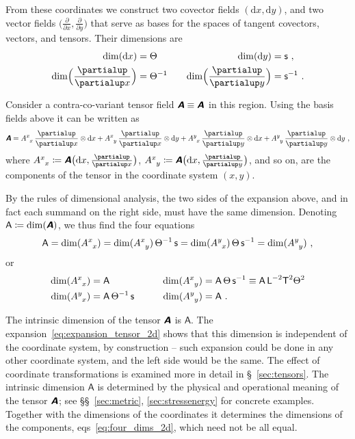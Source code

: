 \documentclass[\ifafour a4paper,12pt,\else a5paper,10pt,\fi%
onecolumn,oneside,article,%
british%
]{memoir}
\makeatletter
\theoremstyle{remark}
\theoremstyle{innote}
\newcommand*{\mathte}[1]{\textbf{\textit{\textsf{#1}}}}
\newcommand*{\de}{\partialup}%
\newcommand*{\di}{\mathrm{d}}%
\newcommand*{\defd}{\coloneqq}
\renewcommand*{\|}[1][]{\nonscript\,#1\vert\nonscript\;\mathopen{}}
\newcommand*{\sect}{\S}%
\newcommand*{\sects}{\S\S}%
\newcommand*{\eqns}{eqs}%
\newcommand*{\q}{}%
\DeclareRobustCommand*{\q}{%
  \mathord{\mathpalette\bigcdot@{}}%
}
\newcommand*{\bigcdot@scalefactor}{0.7}
\newcommand*{\bigcdot@widthfactor}{1.5}
\newcommand*{\bigcdot@}[2]{%
  \sbox0{$#1\vcenter{}$}%
  \sbox2{$#1\cdot\m@th$}%
  \hbox to \bigcdot@widthfactor\wd2{%
    \hfil
    \raise\ht0\hbox{%
      \scalebox{\bigcdot@scalefactor}{%
        \lower\ht0\hbox{$#1\bullet\m@th$}%
      }%
    }%
    \hfil
  }%
}
\newcommand*{\Le}{\textsf{L}}
\newcommand*{\Ti}{\textsf{T}}
\newcommand*{\Te}{\Theta}
\newcommand*{\Ent}{\textsf{s}}
\newcommand*{\Aa}{\textsf{A}}
\newcommand*{\yA}{\mathte{A}}
\renewcommand*{\i}{\indices}
\makeatother
\begin{document}
From these coordinates we construct two covector fields $(\di x, \di y)$,
and two vector fields $\bigl(\frac{\de}{\de x}, \frac{\de}{\de y}\bigr)$
that serve as bases for the spaces of tangent covectors, vectors, and
tensors. Their dimensions are
\begin{equation}
  \label{eq:example_basisvects2d}
  \begin{aligned}
    \dim(\di x)&=\Te &\quad \dim(\di y)&= \Ent \ ,
    \\
    \dim\Bigl(\frac{\de}{\de x}\Bigr)&=\Te^{-1} &\quad \dim\Bigl(\frac{\de}{\de y}\Bigr)&= \Ent^{-1} \ .
  \end{aligned}
\end{equation}


Consider a contra-co-variant tensor field $\yA \equiv \yA\i{^{\q}_{\q}}$ in
this region. Using the basis fields above it can be written as
\begin{equation}
  \label{eq:expansion_tensor_2d}
  \yA = 
  A\i{^{x}_{x}}\,\frac{\de}{\de x} \otimes\di x + 
  A\i{^{x}_{y}}\,\frac{\de}{\de x} \otimes\di y + 
  A\i{^{y}_{x}}\,\frac{\de}{\de y} \otimes\di x + 
  A\i{^{y}_{y}}\,\frac{\de}{\de y} \otimes\di y \ ,
\end{equation}
where $A\i{^{x}_{x}} \defd \yA\bigl(\di x, \frac{\de}{\de x}\bigr)$,
$A\i{^{x}_{y}} \defd \yA\bigl(\di x, \frac{\de}{\de y}\bigr)$, and so on,
are the components of the tensor in the coordinate system $(x, y)$.

By the rules of dimensional analysis, the two sides of the expansion above,
and in fact each summand on the right side, must have the same dimension.
Denoting $\Aa \defd \dim(\yA)$, we thus find the four equations
\begin{equation*}
  \label{eq:four_dims_2d_pre}
    \Aa = \dim(A\i{^{x}_{x}}) =
 \dim(A\i{^{x}_{y}})\,\Te^{-1}\,\Ent 
 =
 \dim(A\i{^{y}_{x}})\,\Te\,\Ent^{-1}
 =
 \dim(A\i{^{y}_{y}}) \ ,
\end{equation*}
or
\begin{equation}
  \label{eq:four_dims_2d}
  \begin{aligned}
    \dim(A\i{^{x}_{x}}) &= \Aa &\qquad 
 \dim(A\i{^{x}_{y}}) &=\Aa\,\Te\,\Ent^{-1} \equiv
\Aa\,\Le^{-2}\Ti^{2}\Te^{2}
    \\
    \dim(A\i{^{y}_{x}}) &= \Aa\,\Te^{-1}\,\Ent &\qquad
 \dim(A\i{^{y}_{y}}) &= \Aa \ .
  \end{aligned}
\end{equation}

The intrinsic dimension of the tensor $\yA$ is $\Aa$. The
expansion~\eqref{eq:expansion_tensor_2d} shows that this dimension is
independent of the coordinate system, by construction -- such expansion
could be done in any other coordinate system, and the left side would be
the same. The effect of coordinate transformations is examined more in
detail in \sect~\ref{sec:tensors}. The intrinsic dimension $\Aa$ is
determined by the physical and operational meaning of the tensor $\yA$; see
\sects~\ref{sec:metric}, \ref{sec:stressenergy} for concrete examples.
Together with the dimensions of the coordinates it determines the
dimensions of the components, \eqns~\eqref{eq:four_dims_2d}, which need not
be all equal.
\end{document}
